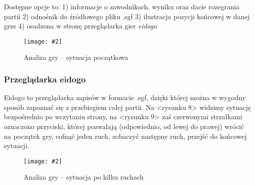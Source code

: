 \documentclass[10pt,leqno]{article}
\newcommand{\myimage}[3]{
  \begin{figure}[h!]
    \centering
      \texttt{[image: \#2]}
  \caption{#3}
  \end{figure}
}
\begin{document}
Dostępne opcje to:
1) informacje o zawodnikach, wyniku oraz dacie rozegrania partii
2) odnośnik do źródłowego pliku .sgf
3) ilustracja pozycji końcowej w danej grze
4) osadzona w stronę przeglądarka gier \emph{eidogo}

\myimage{0.47}{gameDetailsMain.png}{Analiza gry -- sytuacja początkowa}

\subsubsection{Przeglądarka eidogo}
  Eidogo to przeglądarka zapisów w formacie .sgf, dzięki której można w wygodny sposób zapoznać się z przebiegiem całej partii. 
  Na <rysunku 8> widzimy sytuację bezpośrednio po wczytaniu strony, na <rysunku 9> zaś czerwonymi strzałkami oznaczono przyciski,
  której pozwalają (odpowiednio, od lewej do prawej) wrócić na początek gry, cofnąć jeden ruch, zobaczyć następny ruch,
  przejść do końcowej sytuacji.
   
\myimage{0.47}{gameDetails.png}{Analiza gry -- sytuacja po kilku ruchach}

\end{document}
